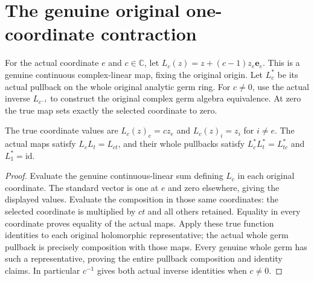 \section{The genuine original one-coordinate contraction}

\begin{definition}
\label{hir:actual-axis-contraction}
\leanok
For the actual coordinate $e$ and $c\in\mathbb C$, let
$L_c(z)=z+(c-1)z_e\mathbf e_e$. This is a genuine continuous complex-linear
map, fixing the original origin. Let $L_c^*$ be its actual pullback on the
whole original analytic germ ring. For $c\ne0$, use the actual inverse
$L_{c^{-1}}$ to construct the original complex germ algebra equivalence.
At zero the true map sets exactly the selected coordinate to zero.
\end{definition}

\begin{theorem}
\label{hir:actual-axis-contraction-whole-coordinate-dictionary}
\leanok
The true coordinate values are $L_c(z)_e=cz_e$ and $L_c(z)_i=z_i$ for
$i\ne e$. The actual maps satisfy $L_cL_t=L_{ct}$, and their whole
pullbacks satisfy $L_c^*L_t^*=L_{tc}^*$ and $L_1^*=\mathrm{id}$.
\end{theorem}
\begin{proof}
Evaluate the genuine continuous-linear sum defining $L_c$ in each original
coordinate. The standard vector is one at $e$ and zero elsewhere, giving
the displayed values. Evaluate the composition in those same coordinates:
the selected coordinate is multiplied by $ct$ and all others retained.
Equality in every coordinate proves equality of the actual maps. Apply
these true function identities to each original holomorphic representative;
the actual whole germ pullback is precisely composition with those maps.
Every genuine whole germ has such a representative, proving the entire
pullback composition and identity claims. In particular $c^{-1}$ gives
both actual inverse identities when $c\ne0$.
\end{proof}

